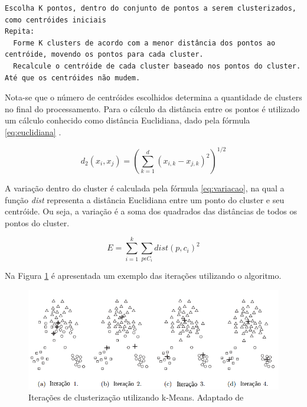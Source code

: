 \lstset{language=HTML, numbers=left, stepnumber=1}
\begin{lstlisting}
Escolha K pontos, dentro do conjunto de pontos a serem clusterizados, como centróides iniciais
Repita:
  Forme K clusters de acordo com a menor distância dos pontos ao centróide, movendo os pontos para cada cluster.
  Recalcule o centróide de cada cluster baseado nos pontos do cluster.
Até que os centróides não mudem.
\end{lstlisting}

Nota-se que o número de centróides escolhidos determina a quantidade de clusters no final do processamento.
Para o cálculo da distância entre os pontos é utilizado um cálculo conhecido como distância Euclidiana, 
dado pela fórmula \ref{eq:euclidiana} \cite{clustering_review, tan2013data, han2011data}.

\begin{equation} \label{eq:euclidiana}
  d_{2}(x_i, x_j) = (\sum_{k=1}^{d} (x_{i,k} - x_{j,k})^2)^{1/2}
\end{equation}

A variação dentro do cluster é calculada pela fórmula \ref{eq:variacao}, na qual a 
função \textit{dist} representa a distância Euclidiana entre um ponto do
cluster e seu centróide. Ou seja, a variação é a soma dos quadrados
das distâncias de todos os pontos do cluster.

\begin{equation} \label{eq:variacao}
  E = \sum_{i=1}^{k} \sum_{p \epsilon C_{i}} dist(p, c_i)^2
\end{equation}

Na Figura \ref{fig:iteracoes_kmeans} é apresentada um exemplo das iterações utilizando o algoritmo.

\begin{figure}[h!]
\centering
\includegraphics[scale=0.6]{figuras/iteracoes_kmeans.png}
\caption{Iterações de clusterização utilizando k-Means. Adaptado de }
\label{fig:iteracoes_kmeans}
\end{figure}

